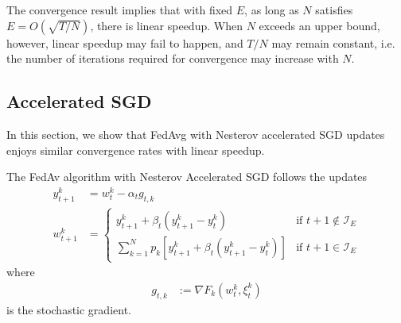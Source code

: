 The convergence result implies that with fixed $E$, as long as $N$ satisfies $E=O(\sqrt{T/N})$, there is linear speedup. When $N$ exceeds an upper bound, however, linear speedup may fail to happen, and $T/N$ may remain constant, i.e. the number of iterations required for convergence may increase with $N$. 

\subsection{Accelerated SGD}
In this section, we show that FedAvg with Nesterov accelerated SGD updates enjoys similar convergence rates with linear speedup. 

The FedAv algorithm with Nesterov Accelerated
SGD follows the updates
\begin{align*}
y_{t+1}^{k} & =w_{t}^{k}-\alpha_{t}g_{t,k}\\
w_{t+1}^{k} & =\begin{cases}
y_{t+1}^{k}+\beta_{t}(y_{t+1}^{k}-y_{t}^{k}) & \text{if }t+1\notin\mathcal{I}_{E}\\
\sum_{k=1}^{N}p_{k}\left[y_{t+1}^{k}+\beta_{t}(y_{t+1}^{k}-y_{t}^{k})\right] & \text{if }t+1\in\mathcal{I}_{E}
\end{cases}
\end{align*}
where 
\begin{align*}
g_{t,k} & :=\nabla F_{k}(w_{t}^{k},\xi_{t}^{k})
\end{align*}
is the stochastic gradient.

